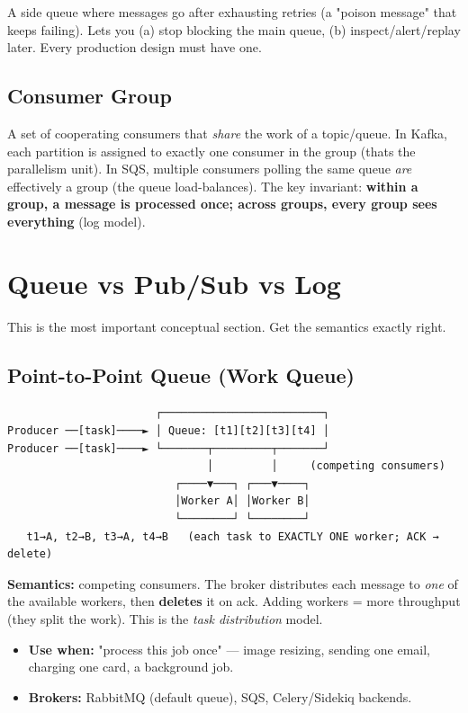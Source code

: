 \documentclass[11pt]{article}
\providecommand{\tightlist}{\setlength{\itemsep}{1pt}\setlength{\parskip}{0pt}}
\begin{document}
A side queue where messages go after exhausting retries (a "poison message" that keeps failing). Lets you (a) stop blocking the main queue, (b) inspect/alert/replay later. Every production design must have one.

\subsection{Consumer Group}\label{consumer-group}

A set of cooperating consumers that \emph{share} the work of a topic/queue. In Kafka, each partition is assigned to exactly one consumer in the group (that\textquotesingle s the parallelism unit). In SQS, multiple consumers polling the same queue \emph{are} effectively a group (the queue load-balances). The key invariant: \textbf{within a group, a message is processed once; across groups, every group sees everything} (log model).

\section{Queue vs Pub/Sub vs Log}\label{queue-vs-pubsub-vs-log}

This is the most important conceptual section. Get the semantics exactly right.

\subsection{Point-to-Point Queue (Work Queue)}\label{point-to-point-queue-work-queue}

\setcodelang{}

\begin{verbatim}
                       ┌─────────────────────────┐
Producer ──[task]────► │ Queue: [t1][t2][t3][t4] │
Producer ──[task]────► └───────┬─────────┬───────┘
                               │         │     (competing consumers)
                          ┌────▼───┐ ┌───▼────┐
                          │Worker A│ │Worker B│
                          └────────┘ └────────┘
   t1→A, t2→B, t3→A, t4→B   (each task to EXACTLY ONE worker; ACK → delete)
\end{verbatim}

\textbf{Semantics:} competing consumers. The broker distributes each message to \emph{one} of the available workers, then \textbf{deletes} it on ack. Adding workers = more throughput (they split the work). This is the \emph{task distribution} model.

\begin{itemize}
\tightlist
\item
  \textbf{Use when:} "process this job once" --- image resizing, sending one email, charging one card, a background job.
\item
  \textbf{Brokers:} RabbitMQ (default queue), SQS, Celery/Sidekiq backends.
\end{itemize}
\end{document}
